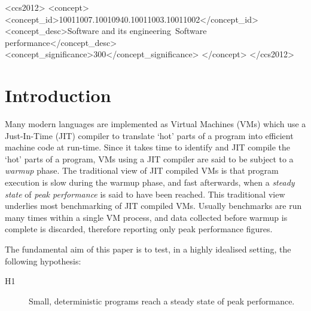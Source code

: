 \documentclass[acmlarge]{acmart}\settopmatter{printfolios=true}
\newcommand{\hypone}{H1\xspace}
\begin{document}

\begin{CCSXML}
<ccs2012>
<concept>
<concept_id>10011007.10010940.10011003.10011002</concept_id>
<concept_desc>Software and its engineering~Software performance</concept_desc>
<concept_significance>300</concept_significance>
</concept>
</ccs2012>
\end{CCSXML}

\maketitle

\section{Introduction}
\label{sec:intro}

Many modern languages are implemented as Virtual Machines (VMs) which use a
Just-In-Time (JIT) compiler to translate `hot' parts of a program into efficient
machine code at run-time. Since it takes time to identify and JIT compile
the `hot' parts of a program, VMs using a JIT compiler are
said to be subject to a \emph{warmup} phase. The traditional view of
JIT compiled VMs is that program execution is slow during the warmup phase, and
fast afterwards, when a \emph{steady state} of \emph{peak performance} is said to have been reached.
This traditional view underlies most benchmarking of JIT compiled VMs.
Usually benchmarks are run many times within a single VM process, and
data collected before warmup is complete is discarded, therefore
reporting only peak performance figures.

The fundamental aim of this paper is to test, in a highly idealised setting, the following hypothesis:
\begin{description}
  \item[\hypone] Small, deterministic programs reach a steady state of peak performance.
\end{description}

\end{document}
